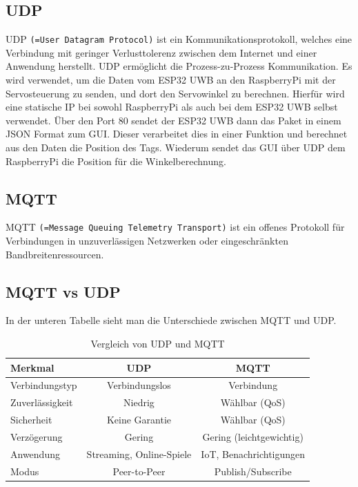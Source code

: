 \subsection{UDP}
UDP \texttt{(=User Datagram Protocol)} ist ein Kommunikationsprotokoll, welches eine Verbindung mit geringer Verlusttolerenz zwischen dem Internet und einer Anwendung herstellt. UDP ermöglicht die Prozess-zu-Prozess Kommunikation. Es wird verwendet, um die Daten vom ESP32 UWB an den RaspberryPi mit der Servosteuerung zu senden, und dort den Servowinkel zu berechnen. Hierfür wird eine statische IP bei sowohl RaspberryPi als auch bei dem ESP32 UWB selbst verwendet. Über den Port 80 sendet der ESP32 UWB dann das Paket in einem JSON Format zum GUI. Dieser verarbeitet dies in einer Funktion und berechnet aus den Daten die Position des Tags. Wiederum sendet das GUI über UDP dem RaspberryPi die Position für die Winkelberechnung. \parencite{UDP}

\subsection{MQTT}
MQTT \texttt{(=Message Queuing Telemetry Transport)} ist ein offenes Protokoll für Verbindungen in unzuverlässigen Netzwerken oder eingeschränkten Bandbreitenressourcen. \parencite{MQTT}

\subsection{MQTT vs UDP}
In der unteren Tabelle sieht man die Unterschiede zwischen MQTT und UDP.
\begin{table}[H]
	\centering
	\begin{tabular}{|l|c|c|}
		\hline
		\textbf{Merkmal} & \textbf{UDP} & \textbf{MQTT} \\
		\hline
		Verbindungstyp & Verbindungslos & Verbindung \\
		\hline
		Zuverlässigkeit & Niedrig & Wählbar (QoS) \\
		\hline
		Sicherheit & Keine Garantie & Wählbar (QoS) \\
		\hline
		Verzögerung & Gering & Gering (leichtgewichtig) \\
		\hline
		Anwendung & Streaming, Online-Spiele & IoT, Benachrichtigungen \\
		\hline
		Modus & Peer-to-Peer & Publish/Subscribe \\
		\hline
	\end{tabular}
	\caption{Vergleich von UDP und MQTT}
	\label{tab:udp_mqtt}
	\textcite{MQTTvsUDP}
\end{table}

